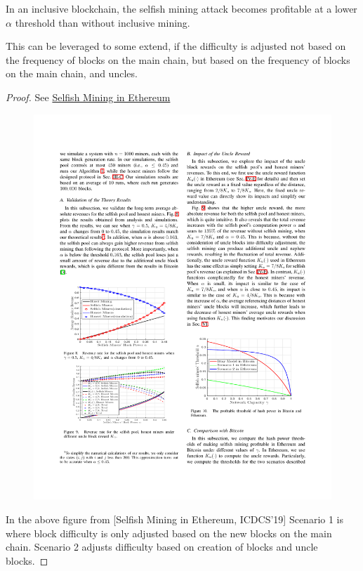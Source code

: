 \begin{theorem} 
In an inclusive blockchain, the selfish mining attack becomes profitable at a lower $\alpha$ threshold than without inclusive mining.

This can be leveraged to some extend, if the difficulty is adjusted not based on the frequency of blocks on the main chain, but based on the frequency of blocks on the main chain, and uncles.
\end{theorem}
\begin{proof} See \href{https://arxiv.org/pdf/1901.04620.pdf}{Selfish Mining in Ethereum} 
	\begin{figure}[H]
		\centering
		\includegraphics{fig/inclusive-selfish-mining}
	\end{figure}
	In the above figure from [Selfish Mining in Ethereum, ICDCS'19] Scenario 1 is where block difficulty is only adjusted based on the new blocks on the main chain.
	Scenario 2 adjusts difficulty based on creation of blocks and uncle blocks.
	
\end{proof}

